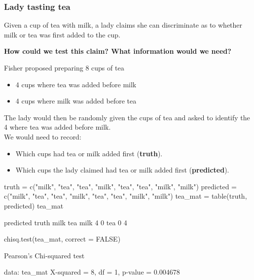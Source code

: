 \documentclass[a4paper]{article}
\begin{document}
\subsubsection{Lady tasting tea}
Given a cup of tea with milk, a lady claims she can discriminate as to whether milk or tea was first added to the cup.
\begin{greenbox}
	\textbf{How could we test this claim? What information would we need?}
\end{greenbox}
Fisher proposed preparing 8 cups of tea
\begin{itemize}
	\item 4 cups where tea was added before milk
	\item 4 cups where milk was added before tea
\end{itemize}
The lady would then be randomly given the cups of tea and asked to identify the 4 where tea was added before milk.\\
We would need to record:
\begin{itemize}
	\item Which cups had tea or milk added first (\textbf{truth}).
	\item Which cups the lady claimed had tea or milk added first (\textbf{predicted}).
\end{itemize}
\begin{Schunk}
\begin{Sinput}
truth = c("milk", "tea", "tea", "milk", "tea", "tea", "milk", "milk")
predicted = c("milk", "tea", "tea", "milk", "tea", "tea", "milk", "milk")
tea_mat = table(truth, predicted)
tea_mat
\end{Sinput}
\begin{Soutput}
      predicted
truth  milk tea
  milk    4   0
  tea     0   4
\end{Soutput}
\begin{Sinput}
chisq.test(tea_mat, correct = FALSE)
\end{Sinput}
\begin{Soutput}

	Pearson's Chi-squared test

data:  tea_mat
X-squared = 8, df = 1, p-value = 0.004678
\end{Soutput}
\end{Schunk}
\end{document}
